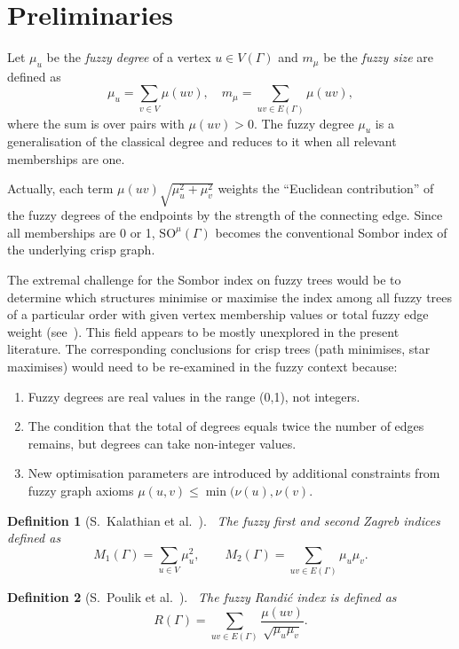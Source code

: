 \documentclass[12pt]{amsart}
\newtheorem{definition}{Definition}
\newcommand{\SOG}{\mathrm{SO}^{\mu}}
\begin{document}
\section{Preliminaries}
Let $\mu_u$ be the \emph{fuzzy degree} of a vertex $u \in V(\Gamma)$ and $m_{\mu}$ be the \emph{fuzzy size} are defined as
\[
\mu_u = \sum_{v \in V} \mu(uv), \quad m_{\mu} = \sum_{uv \in E(\Gamma)} \mu(uv),
\]
where the sum is over pairs with $\mu(uv) > 0$. The fuzzy degree $\mu_u$ is a generalisation of the classical degree and reduces to it when all relevant memberships are one. 

Actually, each term $\mu(uv) \sqrt{\mu_u^2 + \mu_v^2}$ weights the ``Euclidean contribution'' of the fuzzy degrees of the endpoints by the strength of the connecting edge. Since all memberships are 0 or 1, $\SOG(\Gamma)$ becomes the conventional Sombor index of the underlying crisp graph.

The extremal challenge for the Sombor index on fuzzy trees would be to determine which structures minimise or maximise the index among all fuzzy trees of a particular order with given vertex membership values or total fuzzy edge weight (see~\cite{Akram2023fuzzy, Kosari2023some}). This field appears to be mostly unexplored in the present literature. The corresponding conclusions for crisp trees (path minimises, star maximises) would need to be re-examined in the fuzzy context because:
\begin{enumerate}
    \item Fuzzy degrees are real values in the range (0,1), not integers.
    \item The condition that the total of degrees equals twice the number of edges remains, but degrees can take non-integer values.
    \item New optimisation parameters are introduced by additional constraints from fuzzy graph axioms $\mu(u,v) \leq \min(\nu(u), \nu(v)$.
\end{enumerate}





\begin{definition}[S.~Kalathian et al.~\cite{Kalathian2020S}]~\label{ZagrebIndices001}
The fuzzy first and second Zagreb indices defined as
\[
M_1(\Gamma)=\sum_{u \in V} \mu_u^2, \qquad M_2(\Gamma)=\sum_{uv \in E(\Gamma)} \mu_u \mu_v.
\]
\end{definition}

\begin{definition}[S.~Poulik et al.~\cite{Poulikrad2024}]~\label{fuzzrand001}
The fuzzy Randi\'{c} index is defined as
\[
R(\Gamma) = \sum_{uv \in E(\Gamma)} \frac{\mu(uv)}{\sqrt{\mu_u \mu_v}}.
\]
\end{definition}
\end{document}
